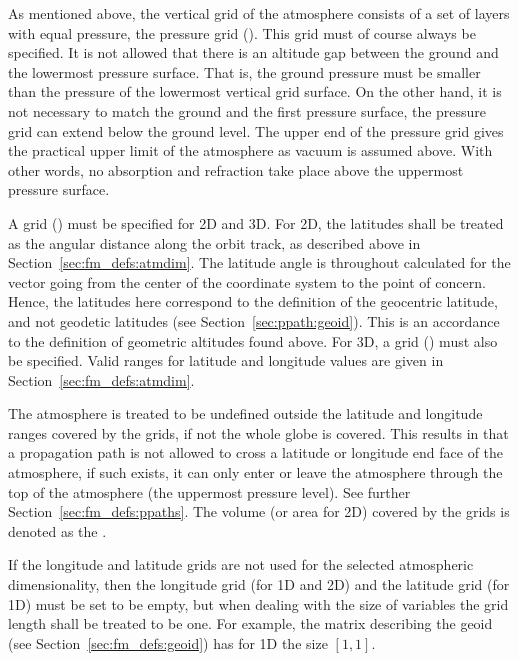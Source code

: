 \label{sec:fm_defs:grids}

As mentioned above, the vertical grid of the atmosphere consists of a
set of layers with equal pressure, the pressure grid
().  This grid must of course always be specified.
It is not allowed that there is an altitude gap between the ground and
the lowermost pressure surface.  That is, the ground pressure must be
smaller than the pressure of the lowermost vertical grid surface. On
the other hand, it is not necessary to match the ground and the first
pressure surface, the pressure grid can extend below the ground level.
The upper end of the pressure grid gives the practical upper limit of
the atmosphere as vacuum is assumed above. With other words, no
absorption and refraction take place above the uppermost pressure
surface.

A  grid () must be specified
for 2D and 3D.  For 2D, the latitudes shall be treated as the angular
distance along the orbit track, as described above in
Section~\ref{sec:fm_defs:atmdim}.  The latitude angle is throughout
calculated for the vector going from the center of the coordinate
system to the point of concern. Hence, the latitudes here correspond
to the definition of the geocentric latitude, and not geodetic
latitudes (see Section~\ref{sec:ppath:geoid}). This is an accordance
to the definition of geometric altitudes found above.  For 3D, a
 grid () must also be specified.
Valid ranges for latitude and longitude values are given in
Section~\ref{sec:fm_defs:atmdim}.

The atmosphere is treated to be undefined outside the latitude and
longitude ranges covered by the grids, if not the whole globe is
covered. This results in that a propagation path is not allowed to
cross a latitude or longitude end face of the atmosphere, if such
exists, it can only enter or leave the atmosphere through the top of
the atmosphere (the uppermost pressure level). See further
Section~\ref{sec:fm_defs:ppaths}. The volume (or area for 2D) covered
by the grids is denoted as the .

If the longitude and latitude grids are not used for the selected
atmospheric dimensionality, then the longitude grid (for 1D and 2D)
and the latitude grid (for 1D) must be set to be empty, but when
dealing with the size of variables the grid length shall be treated to
be one. For example, the matrix describing the geoid (see
Section~\ref{sec:fm_defs:geoid}) has for 1D the size $[1,1]$.

